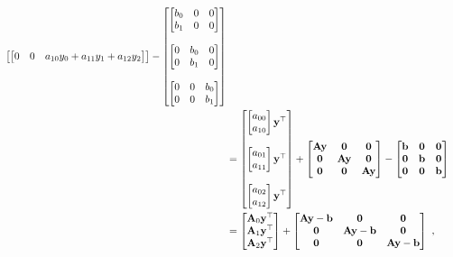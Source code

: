 \begin{align}
\begin{bmatrix}
\begin{bmatrix}
0 & 0 & a_{10} y_0 + a_{11} y_1 + a_{12} y_2
\end{bmatrix}
\end{bmatrix}
-
\begin{bmatrix}
\begin{bmatrix}
b_0 & 0 & 0 \\
b_1 & 0 & 0
\end{bmatrix} \\ \\
\begin{bmatrix}
0 & b_0 & 0\\
0 & b_1 & 0
\end{bmatrix} \\ \\
\begin{bmatrix}
0 & 0 & b_0\\
0 & 0 & b_1
\end{bmatrix}
\end{bmatrix} \nonumber \\
&=
\begin{bmatrix}
\begin{bmatrix}
a_{00} \\
a_{10}
\end{bmatrix} \mathbf{y}^\top \\ \\
\begin{bmatrix}
a_{01} \\
a_{11}
\end{bmatrix} \mathbf{y}^\top \\ \\
\begin{bmatrix}
a_{02} \\
a_{12}
\end{bmatrix} \mathbf{y}^\top
\end{bmatrix}
+
\begin{bmatrix}
\mathbf{A} \mathbf{y} & \mathbf{0} & \mathbf{0} \\
\mathbf{0} & \mathbf{A} \mathbf{y} & \mathbf{0} \\
\mathbf{0} & \mathbf{0} & \mathbf{A} \mathbf{y}
\end{bmatrix}
-
\begin{bmatrix}
\mathbf{b} & \mathbf{0} & \mathbf{0} \\
\mathbf{0} & \mathbf{b} & \mathbf{0} \\
\mathbf{0} & \mathbf{0} & \mathbf{b}
\end{bmatrix} \nonumber \\
&=
\begin{bmatrix}
\mathbf{A}_0 \mathbf{y}^\top \\
\mathbf{A}_1 \mathbf{y}^\top \\
\mathbf{A}_2 \mathbf{y}^\top
\end{bmatrix}
+
\begin{bmatrix}
\mathbf{A} \mathbf{y} - \mathbf{b} & \mathbf{0} & \mathbf{0} \\
\mathbf{0} & \mathbf{A} \mathbf{y} - \mathbf{b} & \mathbf{0} \\
\mathbf{0} & \mathbf{0} & \mathbf{A} \mathbf{y} - \mathbf{b}
\end{bmatrix}\ ,
\end{align}
